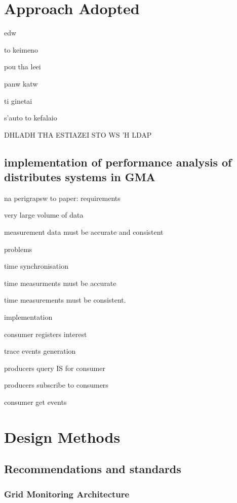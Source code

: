 \section{Approach Adopted}

edw

to keimeno

pou tha leei

panw katw

ti ginetai

s'auto to kefalaio

DHLADH THA ESTIAZEI STO WS 'H LDAP

\newpage

\subsection{implementation of performance analysis of distributes systems in GMA}
na perigrapsw to paper: \cite{balatonuse}
requirements

very large volume of data

measurement data must be accurate and consistent

problems

time synchronisation

time measurments must be accurate

time measurements must be consistent.

implementation

consumer registers interest

trace events generation

producers query IS for consumer

producers subscribe to consumers

consumer get events

\newpage

\section{Design Methods}
\subsection{Recommendations and standards}
\subsubsection{Grid Monitoring Architecture}
\newpage

